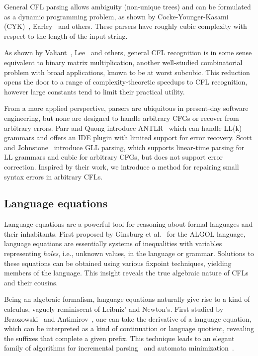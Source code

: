 \documentclass[runningheads]{llncs}
\begin{document}
  General CFL parsing allows ambiguity (non-unique trees) and can be formulated as a dynamic programming problem, as shown by Cocke-Younger-Kasami (CYK)~\cite{sakai1961syntax}, Earley~\cite{earley1970efficient} and others. These parsers have roughly cubic complexity with respect to the length of the input string.

  As shown by Valiant~\cite{valiant1975general}, Lee~\cite{lee2002fast} and others, general CFL recognition is in some sense equivalent to binary matrix multiplication, another well-studied combinatorial problem with broad applications, known to be at worst subcubic. This reduction opens the door to a range of complexity-theoretic speedups to CFL recognition, however large constants tend to limit their practical utility.


  From a more applied perspective, parsers are ubiquitous in present-day software engineering, but none are designed to handle arbitrary CFGs or recover from arbitrary errors. Parr and Quong introduce ANTLR~\cite{parr1995antlr} which can handle LL(k) grammars and offers an IDE plugin with limited support for error recovery. Scott and Johnstone~\cite{scott2010gll} introduce GLL parsing, which supports linear-time parsing for LL grammars and cubic for arbitrary CFGs, but does not support error correction. Inspired by their work, we introduce a method for repairing small syntax errors in arbitrary CFLs.

  \subsection{Language equations}

  Language equations are a powerful tool for reasoning about formal languages and their inhabitants. First proposed by Ginsburg et al.~\cite{ginsburg1962two} for the ALGOL language, language equations are essentially systems of inequalities with variables representing \textit{holes}, i.e., unknown values, in the language or grammar. Solutions to these equations can be obtained using various fixpoint techniques, yielding members of the language. This insight reveals the true algebraic nature of CFLs and their cousins.

  Being an algebraic formalism, language equations naturally give rise to a kind of calculus, vaguely reminiscent of Leibniz' and Newton's. First studied by Brzozowski~\cite{brzozowski1964derivatives,brzozowski1980equations} and Antimirov~\cite{antimirov1996partial}, one can take the derivative of a language equation, which can be interpreted as a kind of continuation or language quotient, revealing the suffixes that complete a given prefix. This technique leads to an elegant family of algorithms for incremental parsing~\cite{might2011parsing,adams2016complexity} and automata minimization~\cite{brzozowski1962canonical}.
\end{document}
